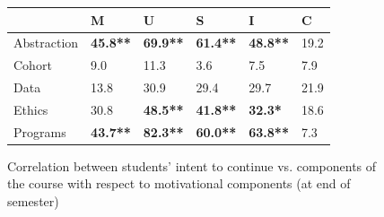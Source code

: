 \documentclass{sig-alternate}
\begin{document}
\begin{figure}[ht!]
\centering
\begin{tabular}{l|lllll}
            & M & U & S & I & C  \\\hline
Abstraction & \textbf{45.8**} & \textbf{69.9**} & \textbf{61.4**} & \textbf{48.8**} & 19.2 \\\hline
Cohort & 9.0 & 11.3 & 3.6 & 7.5 & 7.9 \\\hline
Data & 13.8 & 30.9 & 29.4 & 29.7 & 21.9 \\\hline
Ethics & 30.8 & \textbf{48.5**} & \textbf{41.8**} & \textbf{32.3*} & 18.6 \\\hline
Programs & \textbf{43.7**} & \textbf{82.3**} & \textbf{60.0**} & \textbf{63.8**} & 7.3 \\\hline

\end{tabular}
\caption{Correlation between students' intent to continue vs. components of the course with respect to motivational components (at end of semester)}
\label{tbl-continue}
\end{figure}
\end{document}
